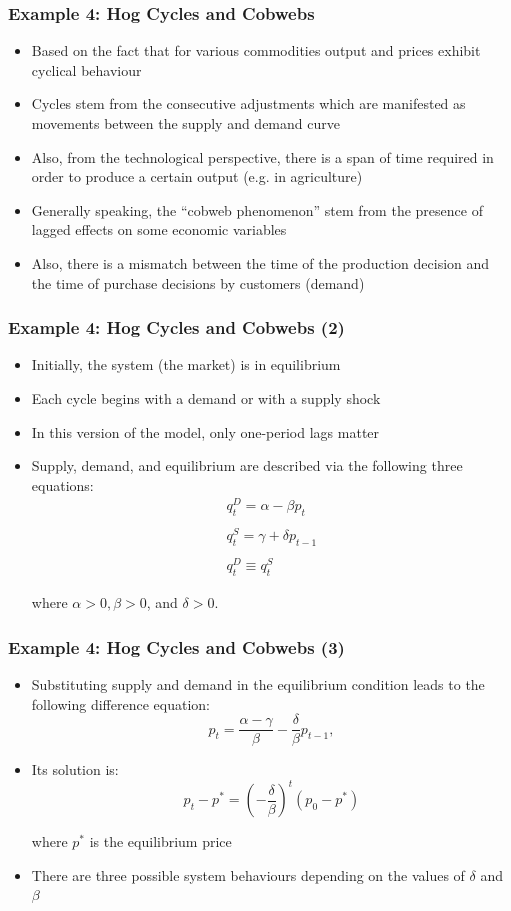 \documentclass[10pt,usenames,dvipsnames]{beamer}
\theoremstyle{definition}
\begin{document}
\begin{frame}[fragile]
\frametitle{Example 4: Hog Cycles and Cobwebs}
\begin{itemize}
	\item Based on the fact that for various commodities output and prices exhibit cyclical behaviour  
	\item Cycles stem from the consecutive adjustments which are manifested as movements between the supply and demand curve
	\item Also, from the technological perspective, there is a span of time required in order to produce a certain output (e.g. in agriculture)
	\item Generally speaking, the ``cobweb phenomenon'' stem from the presence of lagged effects on some economic variables
	\item Also, there is a mismatch between the time of the production decision and the time of purchase decisions by customers (demand)
\end{itemize}
\end{frame}

\begin{frame}[fragile]
\frametitle{Example 4: Hog Cycles and Cobwebs (2)}
\begin{itemize}
	\item Initially, the system (the market) is in equilibrium
	\item Each cycle begins with a demand or with a supply shock
	\item In this version of the model, only one-period lags matter
	\item Supply, demand, and equilibrium are described via the following three equations:
	\[
	\begin{array}{lcl}
		q_{t}^{D} = \alpha - \beta p_{t}\\
		\quad\\
		q_{t}^{S} = \gamma + \delta p_{t-1}\\
		\quad\\
		q_{t}^{D} \equiv q_{t}^{S}
	\end{array}
	\]
	
	where $\alpha > 0, \beta > 0$, and $\delta > 0$.
\end{itemize}
\end{frame}

\begin{frame}[fragile]
\frametitle{Example 4: Hog Cycles and Cobwebs (3)}
\begin{itemize}
	\item Substituting supply and demand in the equilibrium condition leads to the following difference equation:
	\[
		p_{t} = \frac{\alpha - \gamma}{\beta} - \frac{\delta}{\beta}p_{t-1},
	\]
	\item Its solution is:
	\[
		p_{t} - p^{*} = \left(-\frac{\delta}{\beta}\right)^{t}(p_{0} - p^{*})
	\]
	
	where $p^{*}$ is the equilibrium price
	\item There are three possible system behaviours depending on the values of $\delta$ and $\beta$
\end{itemize}
\end{frame}
\end{document}
